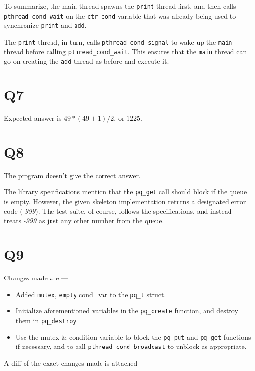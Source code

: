 \documentclass[runningheads,a4paper]{report}
\begin{document}
To summarize, the main thread spawns the \texttt{print} thread first,
and then calls \texttt{pthread\_cond\_wait} on the \texttt{ctr\_cond}
variable that was already being used to synchronize \texttt{print} and
\texttt{add}.

The \texttt{print} thread, in turn, calls
\texttt{pthread\_cond\_signal} to wake up the \texttt{main} thread
before calling \texttt{pthread\_cond\_wait}. This ensures that the
\texttt{main} thread can go on creating the \texttt{add} thread as
before and execute it.

\section*{Q7}

Expected answer is $49*(49+1)/2$, or $1225$.

\section*{Q8}

The program doesn't give the correct answer.

The library specifications mention that the \texttt{pq\_get} call
should block if the queue is empty. However, the given skeleton
implementation returns a designated error code (\textit{-999}). The
test suite, of course, follows the specifications, and instead treats
\textit{-999} as just any other number from the queue.

\section*{Q9}

Changes made are ---

\begin{itemize}
  \item Added \texttt{mutex}, \texttt{\texttt{empty}} cond\_var to the \texttt{pq\_t} struct.
  \item Initialize aforementioned variables in the \texttt{pq\_create}
    function, and destroy them in \texttt{pq\_destroy}
  \item Use the mutex \& condition variable to block the
    \texttt{pq\_put} and \texttt{pq\_get} functions if necessary, and
    to call \texttt{pthread\_cond\_broadcast} to unblock as appropriate.
\end{itemize}

A diff of the exact changes made is attached---
\lstset{caption=Changes made to the queue library to follow the specs
  provided}

\end{document}
